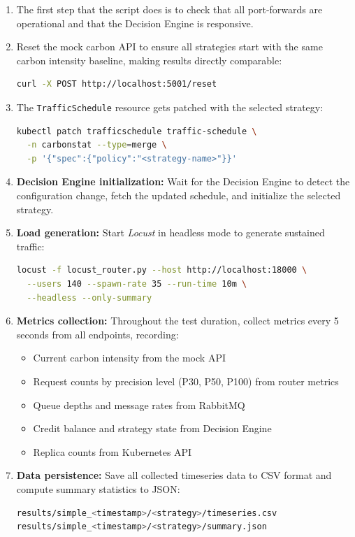 \begin{enumerate}
    \item The first step that the script does is to check that all port-forwards are operational and that the Decision Engine is responsive.
    
    \item Reset the mock carbon API to ensure all strategies start with the same carbon intensity baseline, making results directly comparable:
    \begin{lstlisting}[language=bash, style=compact]
curl -X POST http://localhost:5001/reset\end{lstlisting}
    
    \item The \texttt{TrafficSchedule} resource gets patched with the selected strategy:
    \begin{lstlisting}[language=bash, style=compact]
kubectl patch trafficschedule traffic-schedule \
  -n carbonstat --type=merge \
  -p '{"spec":{"policy":"<strategy-name>"}}'\end{lstlisting}
    
    \item \textbf{Decision Engine initialization:} Wait for the Decision Engine to detect the configuration change, fetch the updated schedule, and initialize the selected strategy.
    
    \item \textbf{Load generation:} Start \textit{Locust} in headless mode to generate sustained traffic:
    \begin{lstlisting}[language=bash, style=compact]
locust -f locust_router.py --host http://localhost:18000 \
  --users 140 --spawn-rate 35 --run-time 10m \
  --headless --only-summary\end{lstlisting}
    
    \item \textbf{Metrics collection:} Throughout the test duration, collect metrics every 5 seconds from all endpoints, recording:
    \begin{itemize}
        \item Current carbon intensity from the mock API
        \item Request counts by precision level (P30, P50, P100) from router metrics
        \item Queue depths and message rates from RabbitMQ
        \item Credit balance and strategy state from Decision Engine
        \item Replica counts from Kubernetes API
    \end{itemize}
    
    \item \textbf{Data persistence:} Save all collected timeseries data to CSV format and compute summary statistics to JSON:
    \begin{lstlisting}[language=bash, style=compact]
results/simple_<timestamp>/<strategy>/timeseries.csv
results/simple_<timestamp>/<strategy>/summary.json\end{lstlisting}
\end{enumerate}

